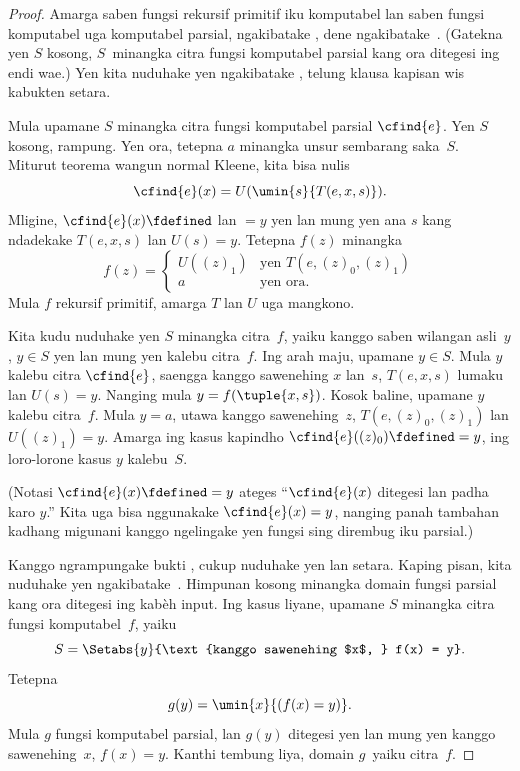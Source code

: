 \documentclass[../../../include/open-logic-section]{subfiles}
\begin{document}
\begin{proof}
Amarga saben fungsi rekursif primitif iku
komputabel lan saben fungsi komputabel uga
komputabel parsial, 
ngakibatake , dene
 ngakibatake~.
(Gatekna yen $S$ kosong, $S$~minangka citra
fungsi komputabel parsial kang ora ditegesi
ing endi wae.) Yen kita nuduhake yen
 ngakibatake
, telung klausa
kapisan wis kabukten setara.

Mula upamane $S$ minangka citra fungsi
komputabel parsial $\cfind{e}$. Yen $S$
kosong, rampung. Yen ora, tetepna $a$
minangka unsur sembarang saka~$S$.
Miturut teorema wangun normal Kleene,
kita bisa nulis
\[
\cfind{e}(x) = U(\umin{s}{T(e, x, s)}).
\]
Mligine, $\cfind{e}(x) \fdefined$ lan
$= y$ yen lan mung yen ana $s$ kang
ndadekake $T(e, x, s)$ lan $U(s) = y$.
Tetepna $f(z)$ minangka
\[
f(z) = \begin{cases}
  U((z)_1) & \text{yen $T(e, (z)_0, (z)_1)$} \\
  a        & \text{yen ora.}
\end{cases}
\]
Mula $f$ rekursif primitif, amarga $T$ lan $U$
uga mangkono. 

Kita kudu nuduhake yen $S$ minangka citra~$f$,
yaiku kanggo saben wilangan asli~$y$,
$y \in S$ yen lan mung yen kalebu
citra~$f$. Ing arah maju, upamane $y \in S$.
Mula $y$ kalebu citra $\cfind{e}$, saengga
kanggo sawenehing $x$ lan~$s$, $T(e,x,s)$
lumaku lan $U(s) = y$. Nanging mula
$y = f(\tuple{x,s})$. Kosok baline,
upamane $y$ kalebu citra~$f$. Mula $y = a$,
utawa kanggo sawenehing~$z$,
$T(e,(z)_0,(z)_1)$ lan $U((z)_1) = y$.
%
Amarga ing kasus kapindho $\cfind{e}((z)_0) \fdefined =
y$, ing loro-lorone kasus $y$ kalebu~$S$.

(Notasi $\cfind{e}(x) \fdefined = y$ ateges
``$\cfind{e}(x)$ ditegesi lan padha karo
$y$.'' Kita uga bisa nggunakake $\cfind{e}(x) =
y$, nanging panah tambahan kadhang migunani
kanggo ngelingake yen fungsi sing dirembug
iku parsial.)

Kanggo ngrampungake bukti ,
cukup nuduhake yen  lan
 setara. Kaping pisan,
kita nuduhake yen 
ngakibatake~.
%
Himpunan kosong minangka domain fungsi parsial kang ora ditegesi ing kabèh input.
Ing kasus liyane, upamane $S$ minangka citra
fungsi komputabel~$f$, yaiku
\[
S = \Setabs{y}{\text{kanggo sawenehing $x$, } f(x) = y}.
\]
Tetepna
\[
g(y) = \umin{x}{(f(x) = y)}.
\]
Mula $g$ fungsi komputabel parsial, lan
$g(y)$ ditegesi yen lan mung yen kanggo
sawenehing~$x$, $f(x) = y$. Kanthi tembung
liya, domain $g$~yaiku citra~$f$.


\end{proof}
\end{document}
